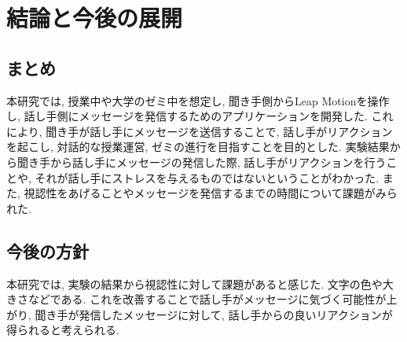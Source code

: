 \documentclass{funthesis}
\begin{document}
\chapter{結論と今後の展開}

\section{まとめ}
本研究では, 授業中や大学のゼミ中を想定し, 聞き手側からLeap Motionを操作し, 話し手側にメッセージを発信するためのアプリケーションを開発した. これにより, 聞き手が話し手にメッセージを送信することで, 話し手がリアクションを起こし, 対話的な授業運営, ゼミの進行を目指すことを目的とした. 実験結果から聞き手から話し手にメッセージの発信した際, 話し手がリアクションを行うことや, それが話し手にストレスを与えるものではないということがわかった. また, 視認性をあげることやメッセージを発信するまでの時間について課題がみられた. 





\section{今後の方針}
本研究では, 実験の結果から視認性に対して課題があると感じた. 文字の色や大きさなどである. これを改善することで話し手がメッセージに気づく可能性が上がり, 聞き手が発信したメッセージに対して, 話し手からの良いリアクションが得られると考えられる. 

\end{document}
